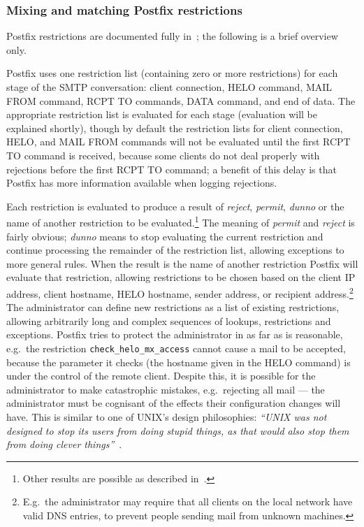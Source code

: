 \subsubsection{Mixing and matching Postfix restrictions}

\label{Mixing and matching Postfix restrictions}

Postfix restrictions are documented fully in~\cite{smtpd_access_readme,
smtpd_per_user_control, policy-servers}; the following is a brief overview
only.

Postfix uses one restriction list (containing zero or more restrictions)
for each stage of the \gls{SMTP} conversation: client connection, HELO
command, MAIL FROM command, RCPT TO commands, DATA command, and end of
data.  The appropriate restriction list is evaluated for each stage
(evaluation will be explained shortly), though by default the restriction
lists for client connection, HELO, and MAIL FROM commands will not be
evaluated until the first RCPT TO command is received, because some clients
do not deal properly with rejections before the first RCPT TO command; a
benefit of this delay is that Postfix has more information available when
logging rejections.

Each restriction is evaluated to produce a result of \textit{reject},
\textit{permit}, \textit{dunno\/} or the name of another restriction to be
evaluated.\footnote{Other results are possible as described
in~\cite{smtpd_access_readme,smtpd_per_user_control,policy-servers}.} The
meaning of \textit{permit\/} and \textit{reject\/} is fairly obvious;
\textit{dunno\/} means to stop evaluating the current restriction and
continue processing the remainder of the restriction list, allowing
exceptions to more general rules.  When the result is the name of another
restriction Postfix will evaluate that restriction, allowing restrictions
to be chosen based on the client \gls{IP} address, client hostname, HELO
hostname, sender address, or recipient address.\footnote{E.g.\ the
administrator may require that all clients on the local network have valid
DNS entries, to prevent people sending mail from unknown machines.}  The
administrator can define new restrictions as a list of existing
restrictions, allowing arbitrarily long and complex sequences of lookups,
restrictions and exceptions.  Postfix tries to protect the administrator in
as far as is reasonable, e.g.\ the restriction
\texttt{check\_helo\_mx\_access} cannot cause a mail to be accepted,
because the parameter it checks (the hostname given in the HELO command) is
under the control of the remote client.  Despite this, it is possible for
the administrator to make catastrophic mistakes, e.g.\ rejecting all mail
--- the administrator must be cognisant of the effects their configuration
changes will have.  This is similar to one of UNIX's design philosophies:
\textit{``UNIX was not designed to stop its users from doing stupid things,
as that would also stop them from doing clever
things''\/}~\cite{unix-philosophy}.


